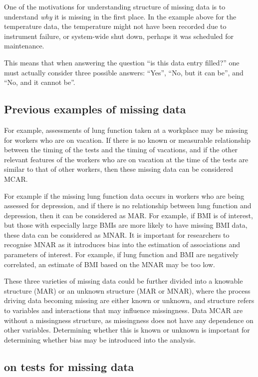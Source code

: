 \documentclass[]{article}
\begin{document}
One of the motivations for understanding structure of missing data is to
understand \emph{why} it is missing in the first place. In the example
above for the temperature data, the temperature might not have been
recorded due to instrument failure, or system-wide shut down, perhaps it
was scheduled for maintenance.

This means that when answering the question ``is this data entry
filled?'' one must actually consider three possible answers: ``Yes'',
``No, but it can be'', and ``No, and it cannot be''.

\subsection{Previous examples of missing
data}\label{previous-examples-of-missing-data}

For example, assessments of lung function taken at a workplace may be
missing for workers who are on vacation. If there is no known or
measurable relationship between the timing of the tests and the timing
of vacations, and if the other relevant features of the workers who are
on vacation at the time of the tests are similar to that of other
workers, then these missing data can be considered MCAR.

For example if the missing lung function data occurs in workers who are
being assessed for depression, and if there is no relationship between
lung function and depression, then it can be considered as MAR. For
example, if BMI is of interest, but those with especially large BMIs are
more likely to have missing BMI data, these data can be considered as
MNAR. It is important for researchers to recognise MNAR as it introduces
bias into the estimation of associations and parameters of interest. For
example, if lung function and BMI are negatively correlated, an estimate
of BMI based on the MNAR may be too low.

These three varieties of missing data could be further divided into a
knowable structure (MAR) or an unknown structure (MAR or MNAR), where
the process driving data becoming missing are either known or unknown,
and structure refers to variables and interactions that may influence
missingness. Data MCAR are without a missingness structure, as
missingness does not have any dependence on other variables. Determining
whether this is known or unknown is important for determining whether
bias may be introduced into the analysis.

\subsection{on tests for missing data}\label{on-tests-for-missing-data}
\end{document}
